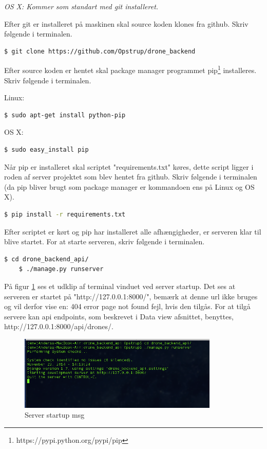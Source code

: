 \textit{OS X: Kommer som standart med git installeret.}

Efter git er installeret på maskinen skal source koden klones fra github. Skriv følgende i terminalen.

\begin{lstlisting}[language=bash]
	$ git clone https://github.com/Opstrup/drone_backend
\end{lstlisting}

Efter source koden er hentet skal package manager programmet pip\footnote{https://pypi.python.org/pypi/pip} installeres. Skriv følgende i terminalen.

Linux:
\begin{lstlisting}[language=bash]
	$ sudo apt-get install python-pip
\end{lstlisting}

OS X:
\begin{lstlisting}[language=bash]
	$ sudo easy_install pip
\end{lstlisting}

Når pip er installeret skal scriptet "requirements.txt" køres, dette script ligger i roden af server projektet som blev hentet fra github. Skriv følgende i terminalen (da pip bliver brugt som package manager er kommandoen ens på Linux og OS X). \\

\begin{lstlisting}[language=bash]
	$ pip install -r requirements.txt
\end{lstlisting}

Efter scriptet er kørt og pip har installeret alle afhængigheder, er serveren klar til blive startet. For at starte serveren, skriv følgende i terminalen.

\begin{lstlisting}[language=bash]
	$ cd drone_backend_api/
	$ ./manage.py runserver
\end{lstlisting}


På figur \ref{fig:server_startup} ses et udklip af terminal vinduet ved server startup. Det ses at serveren er startet på "http://127.0.0.1:8000/", bemærk at denne url ikke bruges og vil derfor vise en: 404 error page not found fejl, hvis den tilgås. For at tilgå servere kan api endpoints, som beskrevet i Data view afsnittet, benyttes, http://127.0.0.1:8000/api/drones/.
\begin{figure}[H]
	\centering
	\includegraphics[width=0.85\textwidth]{Billeder/implementation/server_startup.png}
	\caption{Server startup msg}
	\label{fig:server_startup}
\end{figure}
\newpage


